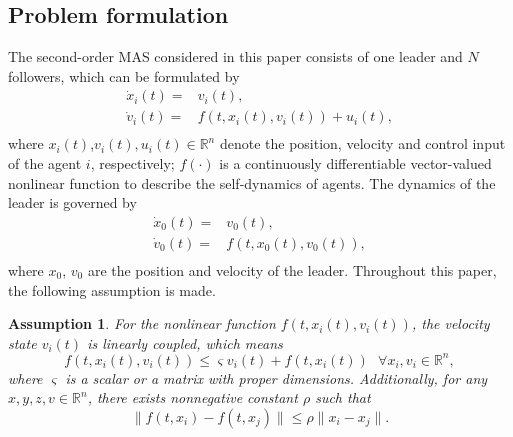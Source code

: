\documentclass[review]{elsarticle}
\newtheorem{assumption}{Assumption}
\begin{document}
\subsection{Problem formulation}
The second-order MAS considered in this paper consists of one leader and $N$ followers, which can be formulated by 
\begin{equation}\label{sys1}
\begin{split}
\dot x_i (t)  =& v_i (t) ,\\
\dot v_i (t)  =& f\left(t,x_i(t),v_i(t) \right) + u_i (t),\\
\end{split}
\end{equation}
where $x_i(t)$,$v_i(t),u_i(t) \in \mathbb{R}^{n}$ denote the position, velocity and control input of the agent $i$, respectively; $f\left(\cdot \right) $ is a continuously differentiable vector-valued nonlinear function to describe the self-dynamics of agents. The dynamics of the leader is governed by
\begin{equation}\label{sys-leader}
\begin{split}
\dot x_0 (t)  =& v_0 (t) ,\\
\dot v_0 (t)  =& f\left(t,x_0(t),v_0(t) \right),\\
\end{split}
\end{equation}
where $x_0$, $v_0$ are the position and velocity of the leader. 
Throughout this paper, the following assumption is made. 
\begin{assumption}\label{ASS1} 
	For the nonlinear function $f(t,x_i(t),v_i(t))$, the velocity state ${v}_i(t)$ is linearly coupled, which means 
	\begin{equation*}
	f(t,x_i(t),v_i(t))\leq \varsigma v_i(t)+ f(t, x_i(t)) ~~~\forall x_i, v_i \in \mathbb{R}^n ,
	\end{equation*} 
	where $\varsigma$ is a scalar or a matrix with proper dimensions. Additionally, for any $ x,y,z,v \in \mathbb{R}^n $, there exists nonnegative constant $\rho$ such that
	\begin{equation*}
	\|f(t,x_i) - f(t,x_{j})\| \leq \rho \|x_i - x_j \|.
	\end{equation*}
\end{assumption}
\end{document}
